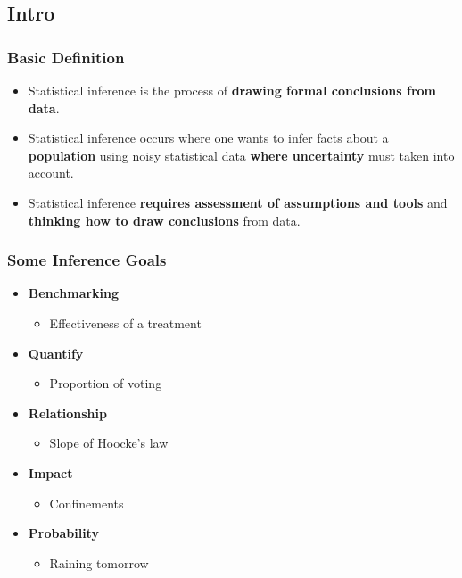 \documentclass[10pt,article]{article}
\begin{document}
\subsection{Intro}
\label{sec:org8079255}
\subsubsection{Basic Definition}
\label{sec:orgf795abe}
\begin{itemize}
\item {\color{green}Statistical inference} is the process of \textbf{drawing formal conclusions from data}.

\item {\color{green}Statistical inference} occurs where one wants to infer facts about a \textbf{population} using noisy statistical data \textbf{where uncertainty} must taken into account.

\item {\color{green}Statistical inference} \textbf{requires assessment of assumptions and tools} and \textbf{thinking how to draw conclusions} from data.
\end{itemize}

\subsubsection{Some Inference Goals}
\label{sec:org1353ef1}
\begin{itemize}
\item \textbf{Benchmarking}
\begin{itemize}
\item Effectiveness of a treatment
\end{itemize}

\item \textbf{Quantify}
\begin{itemize}
\item Proportion of voting
\end{itemize}

\item \textbf{Relationship}
\begin{itemize}
\item Slope of Hoocke's law
\end{itemize}

\item \textbf{Impact}
\begin{itemize}
\item Confinements
\end{itemize}

\item \textbf{Probability}
\begin{itemize}
\item Raining tomorrow
\end{itemize}
\end{itemize}
\end{document}
